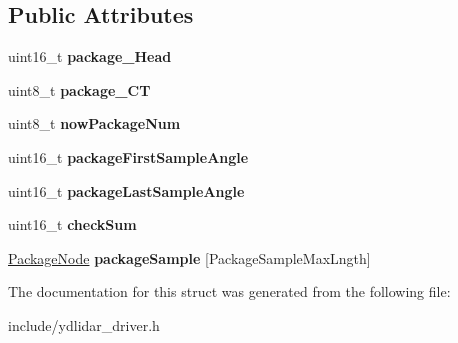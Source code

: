 \subsection*{Public Attributes}
\begin{DoxyCompactItemize}
\item 
uint16\+\_\+t {\bfseries package\+\_\+\+Head}\hypertarget{structnode__package_a6d48d3a1d1ef718065a82e7495fa2b26}{}\label{structnode__package_a6d48d3a1d1ef718065a82e7495fa2b26}

\item 
uint8\+\_\+t {\bfseries package\+\_\+\+CT}\hypertarget{structnode__package_a3be7b81a7cc4b7ef7beb816ccd414579}{}\label{structnode__package_a3be7b81a7cc4b7ef7beb816ccd414579}

\item 
uint8\+\_\+t {\bfseries now\+Package\+Num}\hypertarget{structnode__package_aad0a75920ad5c1393f1b00904ece2d67}{}\label{structnode__package_aad0a75920ad5c1393f1b00904ece2d67}

\item 
uint16\+\_\+t {\bfseries package\+First\+Sample\+Angle}\hypertarget{structnode__package_ac224f6450e8bd5bd069149babc37e1c4}{}\label{structnode__package_ac224f6450e8bd5bd069149babc37e1c4}

\item 
uint16\+\_\+t {\bfseries package\+Last\+Sample\+Angle}\hypertarget{structnode__package_af5768e03270d3b7d7f58b3b82156dc2e}{}\label{structnode__package_af5768e03270d3b7d7f58b3b82156dc2e}

\item 
uint16\+\_\+t {\bfseries check\+Sum}\hypertarget{structnode__package_a4b6d9990da9343143161aae929bb986e}{}\label{structnode__package_a4b6d9990da9343143161aae929bb986e}

\item 
\hyperlink{struct_package_node}{Package\+Node} {\bfseries package\+Sample} \mbox{[}Package\+Sample\+Max\+Lngth\mbox{]}\hypertarget{structnode__package_a284fb0bbde964f2d43661ce6dcd8bca8}{}\label{structnode__package_a284fb0bbde964f2d43661ce6dcd8bca8}

\end{DoxyCompactItemize}


The documentation for this struct was generated from the following file\+:\begin{DoxyCompactItemize}
\item 
include/ydlidar\+\_\+driver.\+h\end{DoxyCompactItemize}
